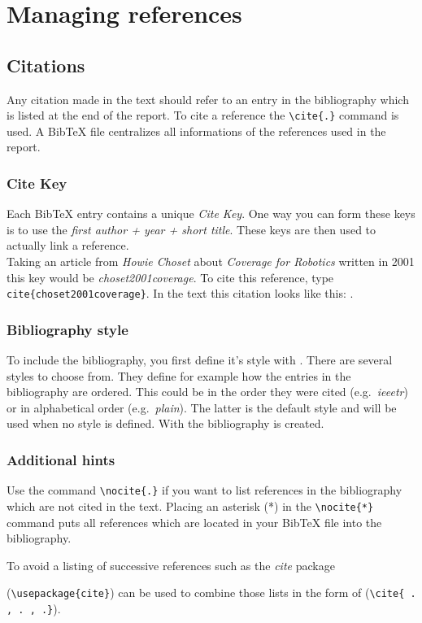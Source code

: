 

\chapter{Managing references}\label{c:references}

\section{Citations}\label{s:citations}
Any citation made in the text should refer to an entry in the bibliography which is listed at the end of the report. To cite a reference the \verb+\cite{.}+ command is used. 
A BibTeX file centralizes all informations of the references used in the report.\\

\subsection{Cite Key}
Each BibTeX entry contains a unique \textit{Cite Key}. One way you can form these keys is to use the \textit{first author + year + short title}. These keys are then used to actually link a reference.\\

Taking an article from \textit{Howie Choset} about \textit{Coverage for Robotics} written in 2001 this key would be \textit{choset2001coverage}. To cite this reference, type \verb+cite{choset2001coverage}+. In the text this citation looks like this: \cite{choset2001coverage}. \\

\subsection{Bibliography style}
To include the bibliography, you first define it's style with \verb++. There are several styles to choose from. They define for example how the entries in the bibliography are ordered. This could be in the order they were cited (e.g.~\textit{ieeetr}) or in alphabetical order (e.g.~\textit{plain}). The latter is the default style and will be used when no style is defined. With \verb++ the bibliography is created. \\


\subsection{Additional hints}
Use the command \verb+\nocite{.}+ if you want to list references in the bibliography which are not cited in the text. Placing an asterisk (*) in the \verb+\nocite{*}+ command puts all references which are located in your BibTeX file into the bibliography.

To avoid a listing of successive references such as \cite{bishop2006pattern}  \cite{choset2001coverage}  \cite{gassert20062dof} the \textit{cite} package

 (\verb+\usepackage{cite}+) can be used to combine those lists in the form of \cite{bishop2006pattern,choset2001coverage,gassert20062dof} (\verb+\cite{ . , . , .}+). 
 
 
 
 
 
